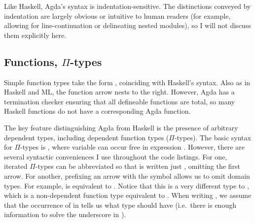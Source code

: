 Like Haskell, Agda's syntax is indentation-sensitive.
The distinctions conveyed by indentation are largely obvious or intuitive to
human readers (for example, allowing for line-continuation or delineating nested
modules), so I will not discuss them explicitly here.

\subsection{Functions, $\Pi$-types}\label{sec:pi-types}

Simple function types take the form
\AgdaSpace{}\AgdaSymbol{$\to$}\AgdaSpace{},
coinciding with Haskell's syntax.
Also as in Haskell and ML, the function arrow nests to the right.
However, Agda has a termination checker ensuring that all defineable functions
are total, so many Haskell functions do not have a corresponding Agda function.

The key feature distinguishing Agda from Haskell is the presence of arbitrary
dependent types, including dependent function types ($\Pi$-types).
The basic syntax for $\Pi$-types is
\AgdaSymbol{(}\AgdaSpace{}\AgdaSymbol{:}\AgdaSpace{}%
\AgdaSymbol{)}\AgdaSpace{}\AgdaSymbol{$\to$}\AgdaSpace{}%
,
where variable  can occur free in expression .
However, there are several syntactic conveniences I use throughout the code
listings.
For one, iterated $\Pi$-types can be abbreviated so that
\AgdaSymbol{(}\AgdaSpace{}\AgdaSymbol{:}\AgdaSpace{}%
\AgdaSymbol{)}\AgdaSpace{}\AgdaSymbol{$\to$}\AgdaSpace{}%
\AgdaSymbol{(}\AgdaSpace{}\AgdaSymbol{:}\AgdaSpace{}%
\AgdaSymbol{)}\AgdaSpace{}\AgdaSymbol{$\to$}\AgdaSpace{}%
is written just
\AgdaSymbol{(}\AgdaSpace{}\AgdaSymbol{:}\AgdaSpace{}%
\AgdaSymbol{)}\AgdaSpace{}%
\AgdaSymbol{(}\AgdaSpace{}\AgdaSymbol{:}\AgdaSpace{}%
\AgdaSymbol{)}\AgdaSpace{}\AgdaSymbol{$\to$}\AgdaSpace{}%
,
omitting the first arrow.
For another, prefixing an arrow with the \AgdaSymbol{$\forall$} symbol allows us
to omit domain types.
For example,
\AgdaSymbol{$\forall$}\AgdaSpace{}\AgdaSpace{}\AgdaSymbol{$\to$}%
\AgdaSpace{}
is equivalent to
\AgdaSymbol{(}\AgdaSpace{}\AgdaSymbol{:}\AgdaSpace{}%
\AgdaSymbol{\_}\AgdaSymbol{)}\AgdaSpace{}\AgdaSymbol{$\to$}%
\AgdaSpace{}.
Notice that this is a very different type to
\AgdaSpace{}\AgdaSymbol{$\to$}\AgdaSpace{},
which is a non-dependent function type equivalent to
\AgdaSymbol{(}\AgdaSymbol{\_}\AgdaSpace{}\AgdaSymbol{:}\AgdaSpace{}%
\AgdaSymbol{)}\AgdaSpace{}\AgdaSymbol{$\to$}\AgdaSpace{}%
.
When writing
\AgdaSymbol{$\forall$}\AgdaSpace{}\AgdaSpace{}\AgdaSymbol{$\to$}%
\AgdaSpace{},
we assume that the occurrence of  in  tells us what
type  should have (i.e.\ there is enough information to solve the
underscore in
\AgdaSymbol{(}\AgdaSpace{}\AgdaSymbol{:}\AgdaSpace{}%
\AgdaSymbol{\_}\AgdaSymbol{)}\AgdaSpace{}\AgdaSymbol{$\to$}%
\AgdaSpace{}).

